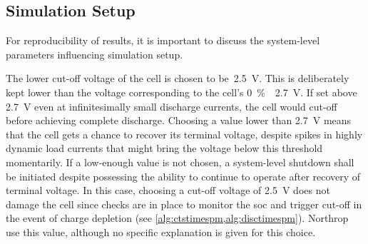 \subsection{Simulation Setup}\label{subsec:basicspmsimsetup}

For  reproducibility of  results, it  is important  to discuss  the system-level
parameters influencing simulation setup.

The lower  cut-off voltage  of the  cell is chosen  to be~\SI{2.5}{\volt}. This
is  deliberately  kept  lower  than  the voltage  corresponding  to  the  cell's
\SI{0}{\percent}~\ie~\SI{2.7}{\volt}.  If set  above  \SI{2.7}{\volt}  even
at  infinitesimally small  discharge  currents, the  cell  would cut-off  before
achieving complete discharge. Choosing a value lower than \SI{2.7}{V} means that
the cell gets a chance to recover its terminal voltage, despite spikes in highly
dynamic  load  currents  that  might  bring the  voltage  below  this  threshold
momentarily. If a low-enough value is  not chosen, a system-level shutdown shall
be  initiated  despite possessing  the  ability  to  continue to  operate  after
recovery  of terminal  voltage.  In this  case, choosing  a  cut-off voltage  of
\SI{2.5}{\volt} does  not damage the cell  since checks are in  place to monitor
the  \gls{soc}  and trigger  cut-off  in  the  event  of charge  depletion  (see
\cref{alg:ctstimespm,alg:disctimespm}).  Northrop~\etal~\cite{Northrop2011}  use
this value, although no specific explanation is given for this choice.

